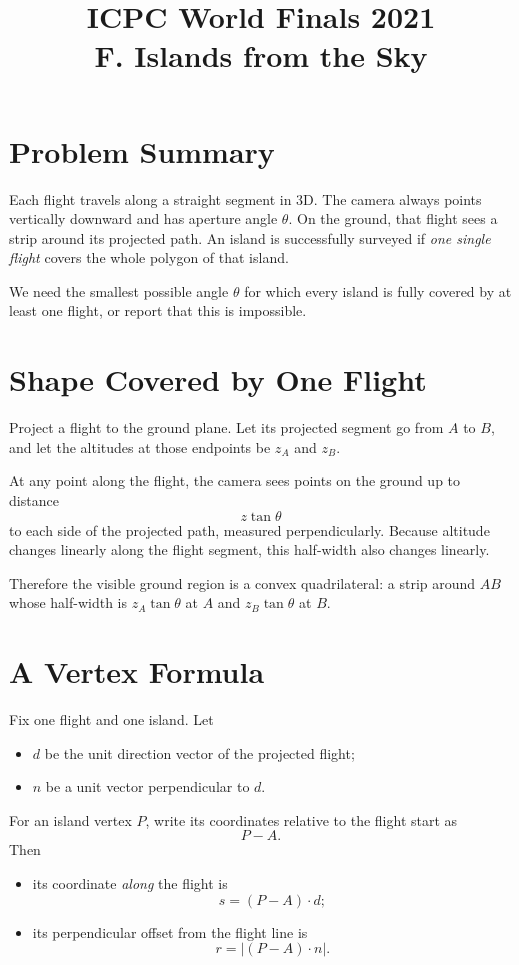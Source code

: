 \documentclass[11pt]{article}
\title{ICPC World Finals 2021\\F. Islands from the Sky}
\author{}
\date{}
\begin{document}
\maketitle

\section*{Problem Summary}

Each flight travels along a straight segment in 3D. The camera always points vertically downward and has
aperture angle $\theta$. On the ground, that flight sees a strip around its projected path. An island is
successfully surveyed if \emph{one single flight} covers the whole polygon of that island.

We need the smallest possible angle $\theta$ for which every island is fully covered by at least one
flight, or report that this is impossible.

\section*{Shape Covered by One Flight}

Project a flight to the ground plane. Let its projected segment go from $A$ to $B$, and let the altitudes
at those endpoints be $z_A$ and $z_B$.

At any point along the flight, the camera sees points on the ground up to distance
\[
    z \tan \theta
\]
to each side of the projected path, measured perpendicularly. Because altitude changes linearly along the
flight segment, this half-width also changes linearly.

Therefore the visible ground region is a convex quadrilateral: a strip around $AB$ whose half-width is
$z_A \tan \theta$ at $A$ and $z_B \tan \theta$ at $B$.

\section*{A Vertex Formula}

Fix one flight and one island. Let
\begin{itemize}[leftmargin=*]
    \item $d$ be the unit direction vector of the projected flight;
    \item $n$ be a unit vector perpendicular to $d$.
\end{itemize}

For an island vertex $P$, write its coordinates relative to the flight start as
\[
    P-A.
\]
Then
\begin{itemize}[leftmargin=*]
    \item its coordinate \emph{along} the flight is
    \[
        s = (P-A)\cdot d;
    \]
    \item its perpendicular offset from the flight line is
    \[
        r = |(P-A)\cdot n|.
    \]
\end{itemize}
\end{document}
